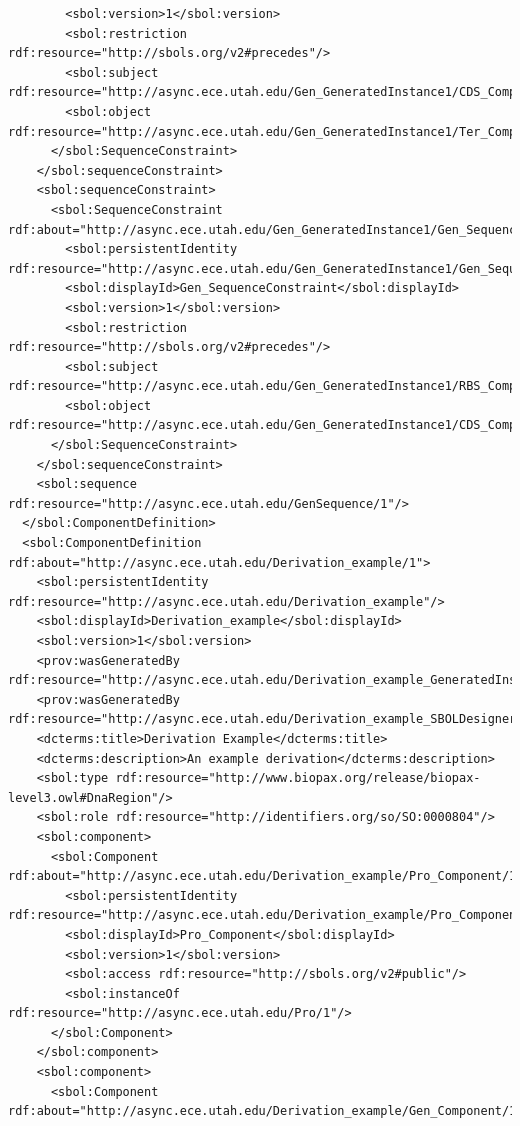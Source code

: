 \begin{lstlisting}
        <sbol:version>1</sbol:version>
        <sbol:restriction rdf:resource="http://sbols.org/v2#precedes"/>
        <sbol:subject rdf:resource="http://async.ece.utah.edu/Gen_GeneratedInstance1/CDS_Component/1"/>
        <sbol:object rdf:resource="http://async.ece.utah.edu/Gen_GeneratedInstance1/Ter_Component/1"/>
      </sbol:SequenceConstraint>
    </sbol:sequenceConstraint>
    <sbol:sequenceConstraint>
      <sbol:SequenceConstraint rdf:about="http://async.ece.utah.edu/Gen_GeneratedInstance1/Gen_SequenceConstraint/1">
        <sbol:persistentIdentity rdf:resource="http://async.ece.utah.edu/Gen_GeneratedInstance1/Gen_SequenceConstraint"/>
        <sbol:displayId>Gen_SequenceConstraint</sbol:displayId>
        <sbol:version>1</sbol:version>
        <sbol:restriction rdf:resource="http://sbols.org/v2#precedes"/>
        <sbol:subject rdf:resource="http://async.ece.utah.edu/Gen_GeneratedInstance1/RBS_Component/1"/>
        <sbol:object rdf:resource="http://async.ece.utah.edu/Gen_GeneratedInstance1/CDS_Component/1"/>
      </sbol:SequenceConstraint>
    </sbol:sequenceConstraint>
    <sbol:sequence rdf:resource="http://async.ece.utah.edu/GenSequence/1"/>
  </sbol:ComponentDefinition>
  <sbol:ComponentDefinition rdf:about="http://async.ece.utah.edu/Derivation_example/1">
    <sbol:persistentIdentity rdf:resource="http://async.ece.utah.edu/Derivation_example"/>
    <sbol:displayId>Derivation_example</sbol:displayId>
    <sbol:version>1</sbol:version>
    <prov:wasGeneratedBy rdf:resource="http://async.ece.utah.edu/Derivation_example_GeneratedInstance21_SBOLDesignerActivity/1"/>
    <prov:wasGeneratedBy rdf:resource="http://async.ece.utah.edu/Derivation_example_SBOLDesignerActivity/1"/>
    <dcterms:title>Derivation Example</dcterms:title>
    <dcterms:description>An example derivation</dcterms:description>
    <sbol:type rdf:resource="http://www.biopax.org/release/biopax-level3.owl#DnaRegion"/>
    <sbol:role rdf:resource="http://identifiers.org/so/SO:0000804"/>
    <sbol:component>
      <sbol:Component rdf:about="http://async.ece.utah.edu/Derivation_example/Pro_Component/1">
        <sbol:persistentIdentity rdf:resource="http://async.ece.utah.edu/Derivation_example/Pro_Component"/>
        <sbol:displayId>Pro_Component</sbol:displayId>
        <sbol:version>1</sbol:version>
        <sbol:access rdf:resource="http://sbols.org/v2#public"/>
        <sbol:instanceOf rdf:resource="http://async.ece.utah.edu/Pro/1"/>
      </sbol:Component>
    </sbol:component>
    <sbol:component>
      <sbol:Component rdf:about="http://async.ece.utah.edu/Derivation_example/Gen_Component/1">

\end{lstlisting}
